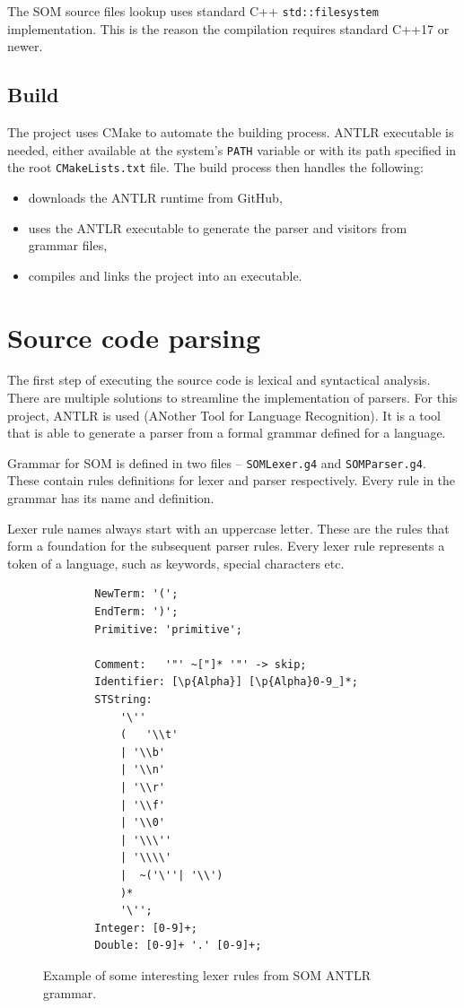 \documentclass[thesis=M,english]{FITthesis}[2019/12/23]
\begin{document}
The SOM source files lookup uses standard C++ \texttt{std::filesystem} implementation. This is the reason the compilation requires
standard C++17 or newer.

\subsection{Build}
The project uses CMake to automate the building process. ANTLR executable is needed, either available at the system's \texttt{PATH}
variable or with its path specified in the root \texttt{CMakeLists.txt} file. The build process then handles the following:
\begin{itemize}
	\item downloads the ANTLR runtime from GitHub,
	\item uses the ANTLR executable to generate the parser and visitors from grammar files,
	\item compiles and links the project into an executable.
\end{itemize}

\section{Source code parsing}
The first step of executing the source code is lexical and syntactical analysis. There are multiple solutions to streamline the
implementation of parsers. For this project, ANTLR is used (ANother Tool for Language Recognition). It is a tool that is able
to generate a parser from a formal grammar defined for a language.

Grammar for SOM is defined in two files -- \texttt{SOMLexer.g4} and 
\texttt{SOMParser.g4}. These contain rules definitions for
lexer and parser respectively. Every rule in the grammar has its name and definition.

Lexer rule names always start with an uppercase letter. These are the rules that form a foundation for the subsequent parser rules.
Every lexer rule represents a token of a language, such as keywords, special characters etc. 

\begin{figure}
	\centering
	\begin{verbatim}
		NewTerm: '(';
		EndTerm: ')';
		Primitive: 'primitive';

		Comment:   '"' ~["]* '"' -> skip;
		Identifier: [\p{Alpha}] [\p{Alpha}0-9_]*;
		STString:
    		'\''
    		(   '\\t'
      		| '\\b'
      		| '\\n'
      		| '\\r'
      		| '\\f'
      		| '\\0'
      		| '\\\''
      		| '\\\\'
      		|  ~('\''| '\\')
    		)*
    		'\'';
		Integer: [0-9]+;
		Double: [0-9]+ '.' [0-9]+;	
	\end{verbatim}
	\caption{Example of some interesting lexer rules from SOM ANTLR grammar.}
	\label{fig:antlr_lexer}
\end{figure}
\end{document}
